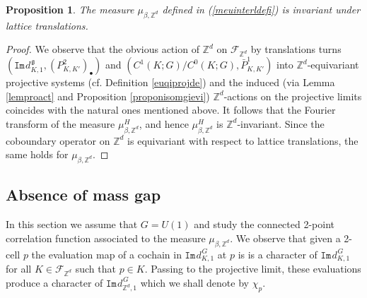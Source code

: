\documentclass[11pt,reqno]{amsart}
\numberwithin{equation}{section}
\newtheorem{proposition}[theorem]{Proposition}
\theoremstyle{remark}
\theoremstyle{rmdefinition}
\begin{document}
\begin{proposition}
The measure $\mu_{\beta, \mathbb{Z}^d}$ defined in (\ref{meuinterldefi}) is invariant under lattice translations.
\end{proposition}
\begin{proof}
We observe that the obvious action of  $\mathbb{Z}^d$ on $\mathcal{F}_{\mathbb{Z}^d}$ by translations turns $(\mathtt{Im}\hspace{1pt}d_{K,1}^{\hspace{1pt}\mathfrak g},
(P^2_{K,K'})_{\bullet})$ and $(C^1(K;G)/C^0(K;G),\bar{P}^1_{K,K'})$
into $\mathbb{Z}^d$-equivariant projective systems (cf. Definition \ref{euqiprojde}) and the induced (via Lemma \ref{lemproact} and Proposition \ref{proponisomgievi}) $\mathbb{Z}^d$-actions on the projective limits coincides with the natural  ones mentioned above. It follows that the Fourier transform of the measure $\mu^{H}_{\beta,\mathbb{Z}^d}$, and hence $\mu^{H}_{\beta,\mathbb{Z}^d}$  is $\mathbb{Z}^d$-invariant.  Since the coboundary operator on $\mathbb{Z}^d$ is equivariant with respect to lattice translations, the same holds for $\mu_{\beta, \mathbb{Z}^d}$.
\end{proof}

\subsection{Absence of mass gap}
In this section we assume that $G=U(1)$ and study the connected 2-point correlation function associated to the measure $\mu_{\beta, \mathbb{Z}^d}$.
We observe that given a 2-cell $p$ the evaluation map of a cochain in $\mathtt{Im}\hspace{1pt}d_{K,1}^{\hspace{1pt}G}$ at $p$ is 
is a character of $\mathtt{Im}\hspace{1pt}d_{K,1}^{\hspace{1pt}G}$ for all $K \in \mathcal{F}_{\mathbb{Z}^d}$ such that $ p \in K$. Passing to the projective limit, these evaluations produce a character of $\mathtt{Im}\hspace{1pt}d_{\mathbb{Z}^d,1}^{\hspace{1pt}G}$ which we shall denote by $\chi_p$.
\end{document}
